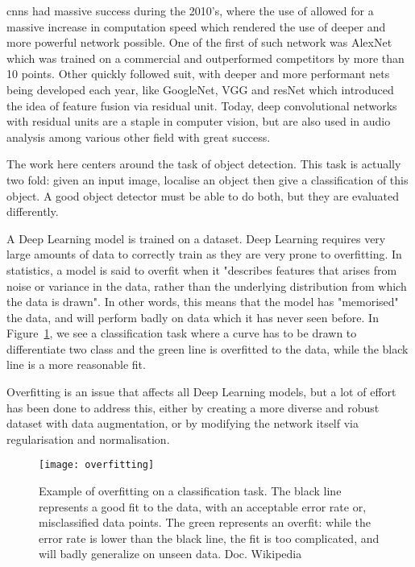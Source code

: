 \glspl{cnn} had massive success during the 2010's, where the use of  allowed for a massive increase in computation speed which rendered the use of deeper and more powerful network possible. One of the first of such network was AlexNet\cite{alexNet} which was trained on a commercial  and outperformed competitors by more than 10 points. Other quickly followed suit, with deeper and more performant nets being developed each year, like GoogleNet\cite{googleNet}, VGG\cite{vgg} and resNet\cite{resNet} which introduced the idea of feature fusion via residual unit. Today, deep convolutional networks with residual units are a staple in computer vision, but are also used in audio analysis\cite{PiczakCNN}\cite{Adavanne_CRNN}\cite{KaoAlRCRNN}\cite{CakirCRNN}\cite{PhanAl_CNN} among various other field with great success.

The work here centers around the task of object detection. This task is actually two fold: given an input image, localise an object then give a classification of this object. A good object detector must be able to do both, but they are evaluated differently. 

A Deep Learning model is trained on a dataset. Deep Learning requires very large amounts of data to correctly train as they are very prone to overfitting. In statistics, a model is said to overfit when it "describes features that arises from noise or variance in the data, rather than the underlying distribution from which the data is drawn"\cite{Webb2010}. In other words, this means that the model has "memorised" the data, and will perform badly on data which it has never seen before. In Figure~\ref{fig:overfit}, we see a classification task where a curve has to be drawn to differentiate two class and the green line is overfitted to the data, while the black line is a more reasonable fit.

Overfitting is an issue that affects all Deep Learning models, but a lot of effort has been done to address this, either by creating a more diverse and robust dataset with data augmentation, or by modifying the network itself via regularisation and normalisation. 

\begin{figure}[h!]
  \centering
  \texttt{[image: overfitting]}
	\caption[Example of overfitting on a classification task]{Example of overfitting on a classification task. The black line represents a good fit to the data, with an acceptable error rate or, misclassified data points. The green represents an overfit: while the error rate is lower than the black line, the fit is too complicated, and will badly generalize on unseen data. Doc. Wikipedia}
  \label{fig:overfit}
\end{figure}

